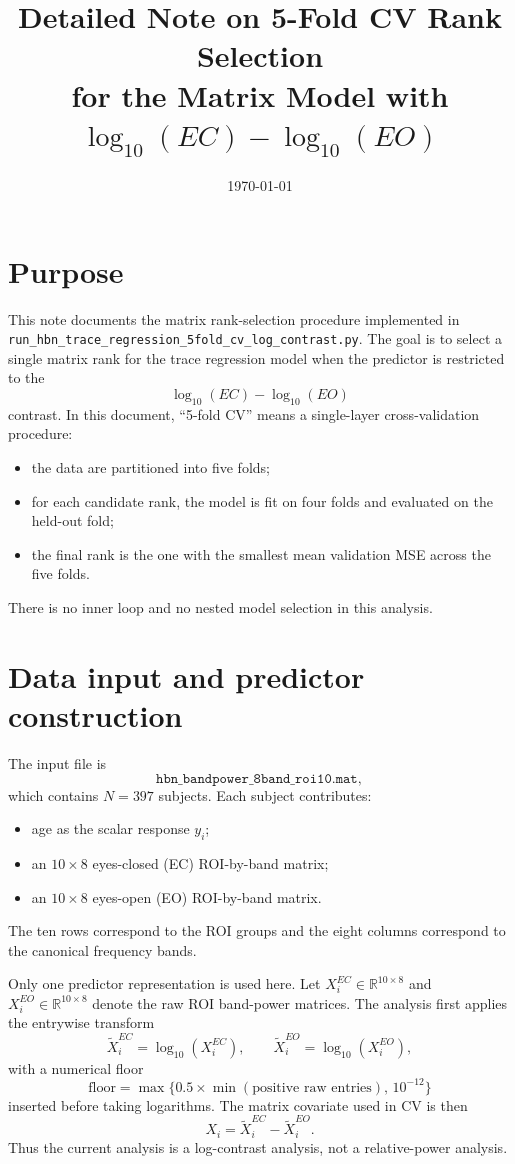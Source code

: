 \documentclass[11pt]{article}
\title{Detailed Note on 5-Fold CV Rank Selection\\for the Matrix Model with $\log_{10}(EC)-\log_{10}(EO)$}
\author{}
\date{\today}
\begin{document}
\maketitle

\section{Purpose}
This note documents the matrix rank-selection procedure implemented in
\texttt{run\_hbn\_trace\_regression\_5fold\_cv\_log\_contrast.py}.
The goal is to select a single matrix rank for the trace regression model when the predictor is restricted to the
\[
\log_{10}(EC)-\log_{10}(EO)
\]
contrast. In this document, ``5-fold CV'' means a single-layer cross-validation procedure:
\begin{itemize}[leftmargin=2em]
    \item the data are partitioned into five folds;
    \item for each candidate rank, the model is fit on four folds and evaluated on the held-out fold;
    \item the final rank is the one with the smallest mean validation MSE across the five folds.
\end{itemize}
There is no inner loop and no nested model selection in this analysis.

\section{Data input and predictor construction}
The input file is
\[
\texttt{hbn\_bandpower\_8band\_roi10.mat},
\]
which contains \(N=397\) subjects. Each subject contributes:
\begin{itemize}[leftmargin=2em]
    \item age as the scalar response \(y_i\);
    \item an \(10\times 8\) eyes-closed (EC) ROI-by-band matrix;
    \item an \(10\times 8\) eyes-open (EO) ROI-by-band matrix.
\end{itemize}
The ten rows correspond to the ROI groups and the eight columns correspond to the canonical frequency bands.

Only one predictor representation is used here. Let \(X_i^{EC}\in\mathbb{R}^{10\times 8}\) and
\(X_i^{EO}\in\mathbb{R}^{10\times 8}\) denote the raw ROI band-power matrices. The analysis first applies the entrywise transform
\[
\widetilde X_i^{EC}=\log_{10}(X_i^{EC}),\qquad
\widetilde X_i^{EO}=\log_{10}(X_i^{EO}),
\]
with a numerical floor
\[
\text{floor}=\max\bigl\{0.5\times \min(\text{positive raw entries}),\,10^{-12}\bigr\}
\]
inserted before taking logarithms. The matrix covariate used in CV is then
\[
X_i=\widetilde X_i^{EC}-\widetilde X_i^{EO}.
\]
Thus the current analysis is a log-contrast analysis, not a relative-power analysis.
\end{document}
